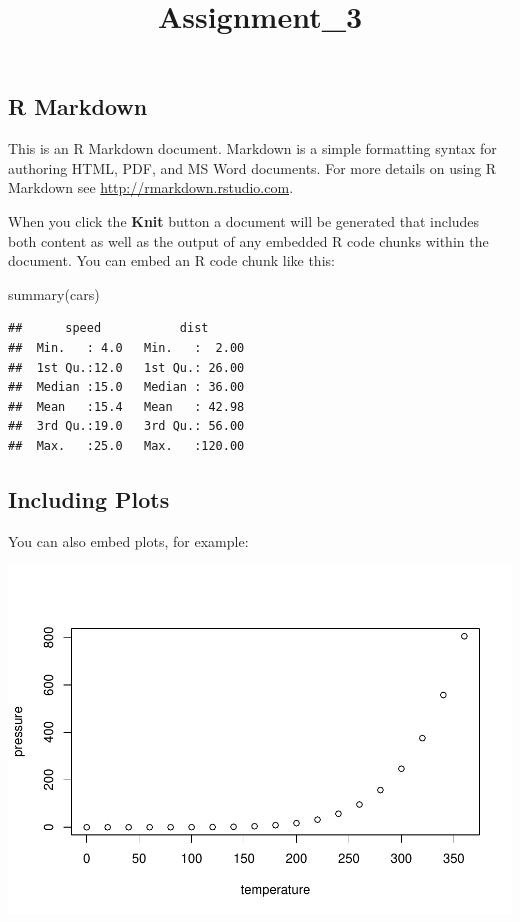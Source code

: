 \documentclass[
]{article}
\title{Assignment\_3}
\author{}
\date{\vspace{-2.5em}}
\newenvironment{Shaded}{\begin{snugshade}}{\end{snugshade}}
\newcommand{\FunctionTok}[1]{\textcolor[rgb]{0.00,0.00,0.00}{#1}}
\newcommand{\NormalTok}[1]{#1}
\begin{document}
\maketitle

\hypertarget{r-markdown}{%
\subsection{R Markdown}\label{r-markdown}}

This is an R Markdown document. Markdown is a simple formatting syntax
for authoring HTML, PDF, and MS Word documents. For more details on
using R Markdown see \url{http://rmarkdown.rstudio.com}.

When you click the \textbf{Knit} button a document will be generated
that includes both content as well as the output of any embedded R code
chunks within the document. You can embed an R code chunk like this:

\begin{Shaded}
\begin{Highlighting}[]
\FunctionTok{summary}\NormalTok{(cars)}
\end{Highlighting}
\end{Shaded}

\begin{verbatim}
##      speed           dist       
##  Min.   : 4.0   Min.   :  2.00  
##  1st Qu.:12.0   1st Qu.: 26.00  
##  Median :15.0   Median : 36.00  
##  Mean   :15.4   Mean   : 42.98  
##  3rd Qu.:19.0   3rd Qu.: 56.00  
##  Max.   :25.0   Max.   :120.00
\end{verbatim}

\hypertarget{including-plots}{%
\subsection{Including Plots}\label{including-plots}}

You can also embed plots, for example:

\includegraphics{Assignment_3_files/figure-latex/pressure-1.pdf}
\end{document}
